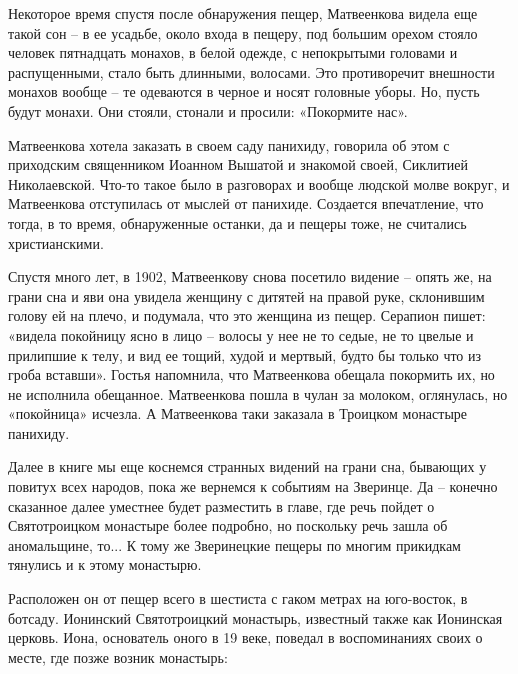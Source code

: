 Некоторое время спустя после обнаружения пещер, Матвеенкова видела еще такой сон – в ее усадьбе, около входа в пещеру, под большим орехом стояло человек пятнадцать монахов, в белой одежде, с непокрытыми головами и распущенными, стало быть длинными, волосами. Это противоречит внешности монахов вообще – те одеваются в черное и носят головные уборы. Но, пусть будут монахи. Они стояли, стонали и просили: «Покормите нас».

Матвеенкова хотела заказать в своем саду панихиду, говорила об этом с приходским священником Иоанном Вышатой и знакомой своей, Сиклитией Николаевской. Что-то такое было в разговорах и вообще людской молве вокруг, и Матвеенкова отступилась от мыслей от панихиде. Создается впечатление, что тогда, в то время, обнаруженные останки, да и пещеры тоже, не считались христианскими.

Спустя много лет, в 1902, Матвеенкову снова посетило видение – опять же, на грани сна и яви она увидела женщину с дитятей на правой руке, склонившим голову ей на плечо, и подумала, что это женщина из пещер. Серапион пишет: «видела покойницу ясно в лицо – волосы у нее не то седые, не то цвелые и прилипшие к телу, и вид ее тощий, худой и мертвый, будто бы только что из гроба вставши». Гостья напомнила, что Матвеенкова обещала покормить их, но не исполнила обещанное. Матвеенкова пошла в чулан за молоком, оглянулась, но «покойница» исчезла. А Матвеенкова таки заказала в Троицком монастыре панихиду.

Далее в книге мы еще коснемся странных видений на грани сна, бывающих у повитух всех народов, пока же вернемся к событиям на Зверинце. Да – конечно сказанное далее уместнее будет разместить в главе, где речь пойдет о Святотроицком монастыре более подробно, но поскольку речь зашла об аномальщине, то... К тому же Зверинецкие пещеры по многим прикидкам тянулись и к этому монастырю.

Расположен он от пещер всего в шестиста с гаком метрах на юго-восток, в ботсаду. Ионинский Святотроицкий монастырь, известный также как Ионинская церковь. Иона, основатель оного в 19 веке, поведал в воспоминаниях своих о месте, где позже возник монастырь:

